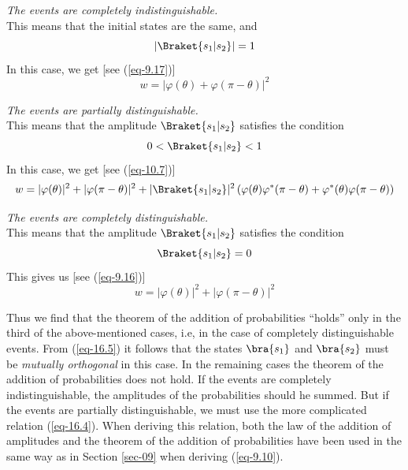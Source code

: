 \documentclass[a4paper,sfsidenotes,colorlinks=true]{tufte-book}
\numberwithin{equation}{section}
\numberwithin{figure}{section}
\begin{document}
\begin{description}[leftmargin=1cm]
\item[First case:] \emph{The events are completely
    indistinguishable.}\\
This means that the initial states are the same, and 
\begin{equation}%
| \Braket{s_{1} | s_{2}} | = 1
\label{eq-16.1}
\end{equation}
In this case, we get [see (\ref{eq-9.17})]
\begin{equation}%
w = | \varphi(\theta) + \varphi (\pi - \theta)|^{2}
\label{eq-16.2}
\end{equation}
\item[Second case:] \emph{The events are partially distinguishable.}
  \\
  This means that the amplitude $\Braket{s_{1} | s_{2}}$ satisfies the condition
\begin{equation}%
0 < \Braket{s_{1} | s_{2}} < 1 
\label{eq-16.3}
\end{equation}
In this case, we get [see (\ref{eq-10.7})]
\begin{equation}%
w = | \varphi(\theta)|^{2} + |\varphi (\pi - \theta)|^{2} + |
\Braket{s_{1} | s_{2}}|^{2} \left( \varphi(\theta) \varphi^{*}
  (\pi - \theta) + \varphi^{*} (\theta) \varphi (\pi -
  \theta) \right)
\label{eq-16.4}
\end{equation}

\item[Third case:] \emph{The events are completely distinguishable.}\\
This means that the amplitude $\Braket{s_{1} | s_{2}}$ satisfies the
condition
\begin{equation}%
 \Braket{s_{1} | s_{2}} = 0
\label{eq-16.5}
\end{equation}
This gives us [see (\ref{eq-9.16})]
\begin{equation}%
w = | \varphi(\theta)|^{2} + |\varphi (\pi - \theta)|^{2} 
\label{eq-16.6}
\end{equation}
\end{description}

Thus we find that the theorem of the addition of probabilities ``holds'' only in the third of the above-mentioned cases, i.e, in the case of completely distinguishable events. From (\ref{eq-16.5}) it follows that the states  $\bra{s_{1}}$ and  $\bra{s_{2}}$ must be \emph{mutually orthogonal} in this case. In the remaining cases the theorem of the addition of probabilities does not hold. If the events are completely indistinguishable, the amplitudes of the probabilities should he summed. But if the events are partially distinguishable, we must use the more complicated relation (\ref{eq-16.4}). When deriving this relation, both the law of the addition of amplitudes and the theorem of the addition of probabilities have been used in the same way as in Section \ref{sec-09} when deriving (\ref{eq-9.10}).
\end{document}
